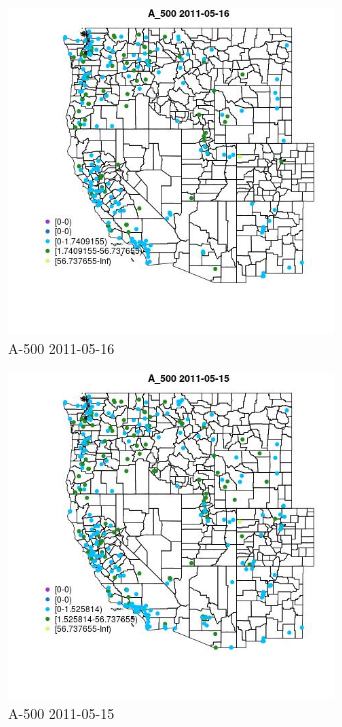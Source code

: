 \begin{figure} 
\centering  
\includegraphics[width=0.77\textwidth]{Code_Outputs/ML_input_report_ML_input_PM25_Step5_part_d_de_duplicated_aves_ML_input_MapObsA_5002011-05-16.jpg} 
\caption{\label{fig:ML_input_report_ML_input_PM25_Step5_part_d_de_duplicated_aves_ML_inputMapObsA_5002011-05-16}A-500 2011-05-16} 
\end{figure} 
 

\begin{figure} 
\centering  
\includegraphics[width=0.77\textwidth]{Code_Outputs/ML_input_report_ML_input_PM25_Step5_part_d_de_duplicated_aves_ML_input_MapObsA_5002011-05-15.jpg} 
\caption{\label{fig:ML_input_report_ML_input_PM25_Step5_part_d_de_duplicated_aves_ML_inputMapObsA_5002011-05-15}A-500 2011-05-15} 
\end{figure} 
 

